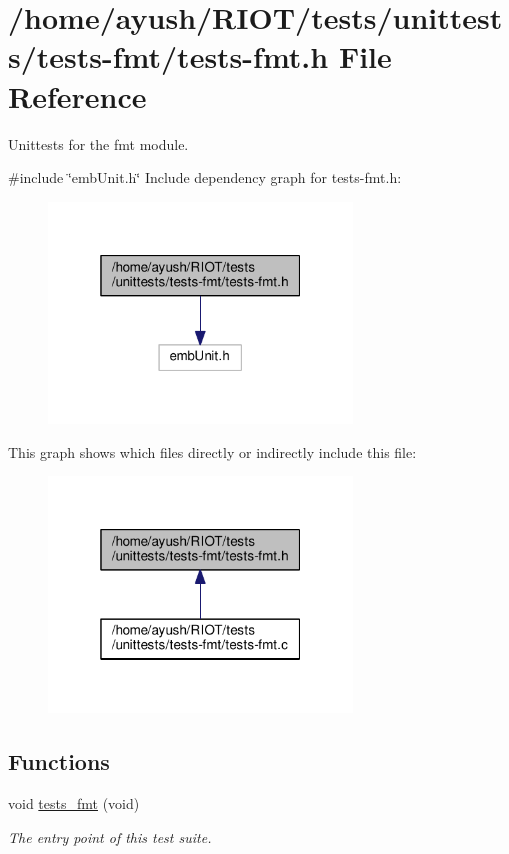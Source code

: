 \hypertarget{tests-fmt_8h}{}\section{/home/ayush/\+R\+I\+O\+T/tests/unittests/tests-\/fmt/tests-\/fmt.h File Reference}
\label{tests-fmt_8h}


Unittests for the {\ttfamily fmt} module.  


{\ttfamily \#include \char`\"{}emb\+Unit.\+h\char`\"{}}\newline
Include dependency graph for tests-\/fmt.h\+:
\nopagebreak
\begin{figure}[H]
\begin{center}
\leavevmode
\includegraphics[width=229pt]{tests-fmt_8h__incl}
\end{center}
\end{figure}
This graph shows which files directly or indirectly include this file\+:
\nopagebreak
\begin{figure}[H]
\begin{center}
\leavevmode
\includegraphics[width=229pt]{tests-fmt_8h__dep__incl}
\end{center}
\end{figure}
\subsection*{Functions}
\begin{DoxyCompactItemize}
\item 
void \hyperlink{group__unittests_ga548762e77adf86c79fe9360cee603bbd}{tests\+\_\+fmt} (void)
\begin{DoxyCompactList}\small\item\em The entry point of this test suite. \end{DoxyCompactList}\end{DoxyCompactItemize}


